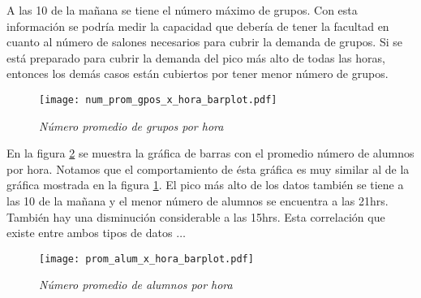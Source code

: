 A las 10 de la mañana se tiene el número máximo de grupos. Con esta información se podría medir la capacidad que debería de tener la facultad en cuanto al número de salones necesarios para cubrir la demanda de grupos. Si se está preparado para cubrir la demanda del pico más alto de todas las horas, entonces los demás casos están cubiertos por tener menor número de grupos.


\begin{figure}[H]
\centering
\texttt{[image: num\_prom\_gpos\_x\_hora\_barplot.pdf]} %
\caption{\textit{Número promedio de grupos por hora}}\label{num_prom_gpos_x_hora_barplot}
\end{figure}

En la figura \ref{prom_alum_x_hora_barplot} se muestra la gráfica de barras con el promedio número de alumnos por hora. Notamos que el comportamiento de ésta gráfica es muy similar al de la gráfica mostrada en la figura \ref{num_prom_gpos_x_hora_barplot}. El pico más alto de los datos también se tiene a las 10 de la mañana y el menor número de alumnos se encuentra a las 21hrs. También hay una disminución considerable a las 15hrs. Esta correlación que existe entre ambos tipos de datos $\ldots$

\begin{figure}[H]
\centering
\texttt{[image: prom\_alum\_x\_hora\_barplot.pdf]} %
\caption{\textit{Número promedio de alumnos por hora}}\label{prom_alum_x_hora_barplot}
\end{figure}

